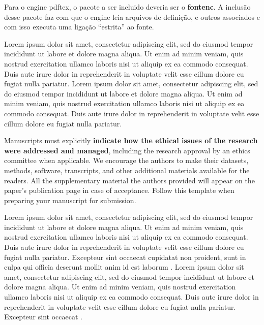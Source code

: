 \documentclass[portuguese]{sbc2025}%
\begin{document}
Para o engine pdftex, o pacote a ser incluido deveria ser o \textbf{fontenc}. A inclusão desse pacote faz com que o engine leia arquivos de definição, e outros associados e com isso executa uma ligação ``estrita'' ao fonte.  


Lorem ipsum dolor sit amet, consectetur adipiscing elit, sed do eiusmod tempor incididunt ut labore et dolore magna aliqua. Ut enim ad minim veniam, quis nostrud exercitation ullamco laboris nisi ut aliquip ex ea commodo consequat. Duis aute irure dolor in reprehenderit in voluptate velit esse cillum dolore eu fugiat nulla pariatur.  Lorem ipsum dolor sit amet, consectetur adipiscing elit, sed do eiusmod tempor incididunt ut labore et dolore magna aliqua. Ut enim ad minim veniam, quis nostrud exercitation ullamco laboris nisi ut aliquip ex ea commodo consequat. Duis aute irure dolor in reprehenderit in voluptate velit esse cillum dolore eu fugiat nulla pariatur. 

\textcolor{blue!50!black}{%
Manuscripts must explicitly \textbf{indicate how the ethical issues of the research were addressed and managed}, including the research approval by an ethics committee when applicable. We encourage the authors to make their datasets, methods, software, transcripts, and other additional materials available for the readers. All the supplementary material the authors provided will appear on the paper's publication page in case of acceptance. Follow this template when preparing your manuscript for submission.}

Lorem ipsum dolor sit amet, consectetur adipiscing elit, sed do eiusmod tempor incididunt ut labore et dolore magna aliqua. Ut enim ad minim veniam, quis nostrud exercitation ullamco laboris nisi ut aliquip ex ea commodo consequat. Duis aute irure dolor in reprehenderit in voluptate velit esse cillum dolore eu fugiat nulla pariatur. Excepteur sint occaecat cupidatat non proident, sunt in culpa qui officia deserunt mollit anim id est laborum \citep{ref1}. Lorem ipsum dolor sit amet, consectetur adipiscing elit, sed do eiusmod tempor incididunt ut labore et dolore magna aliqua. Ut enim ad minim veniam, quis nostrud exercitation ullamco laboris nisi ut aliquip ex ea commodo consequat. Duis aute irure dolor in reprehenderit in voluptate velit esse cillum dolore eu fugiat nulla pariatur. Excepteur sint occaecat \citep{ref2}. 
\end{document}
